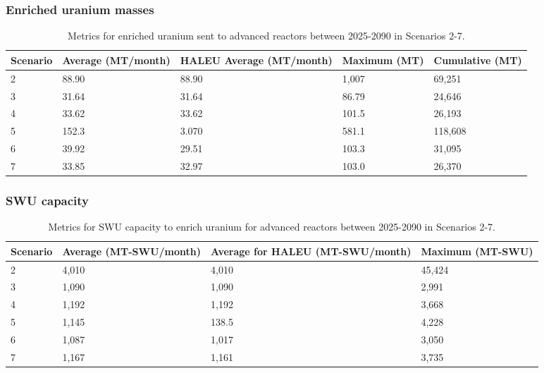 \begin{frame}
    \frametitle{Enriched uranium masses}
    \begin{table}
        \centering 
        \caption{Metrics for enriched uranium sent to advanced 
        reactors between 2025-2090 in Scenarios 2-7.}
        \label{tab:nogrowth_uranium}
        \begin{tabular}{l p{2cm} p{2cm} p{2cm} p{2cm}}
            \hline
            Scenario & Average (MT/month) & \gls{HALEU} Average 
            (MT/month) & Maximum (MT)& Cumulative (MT)\\\hline
            2 & 88.90 & 88.90 & 1,007 & 69,251\\
            3 & 31.64 & 31.64 & 86.79 & 24,646\\
            4 & 33.62 & 33.62 & 101.5 & 26,193\\
            5 & 152.3 & 3.070 & 581.1 & 118,608\\
            6 & 39.92 & 29.51 & 103.3 & 31,095\\
            7 & 33.85 & 32.97 & 103.0 & 26,370\\
            \hline
        \end{tabular}
    \end{table}
\end{frame}

\begin{frame}
    \frametitle{SWU capacity}
    \begin{table}
        \centering 
        \caption{Metrics for \gls{SWU} capacity to enrich uranium for 
        advanced reactors between 2025-2090 in Scenarios 2-7.}
        \label{tab:nogrowth_swu}
        \begin{tabular}{l p{2cm} p{2cm} p{2cm}}
            \hline
            Scenario & Average  (MT-SWU/month) & Average
            for \gls{HALEU} (MT-SWU/month) & Maximum (MT-SWU)\\\hline
            2 & 4,010 & 4,010 & 45,424 \\
            3 & 1,090 & 1,090 & 2,991\\
            4 & 1,192 & 1,192 & 3,668\\
            5 & 1,145 & 138.5 & 4,228 \\
            6 & 1,087 & 1,017 & 3,050\\
            7 & 1,167 & 1,161 & 3,735\\
            \hline
        \end{tabular}
    \end{table}
\end{frame}

